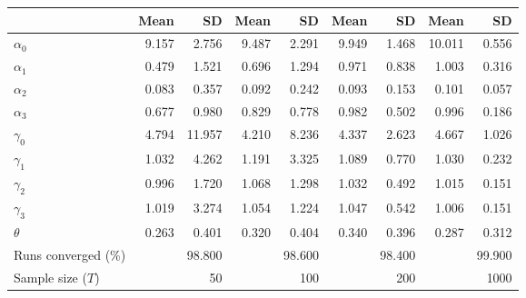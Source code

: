 
\begin{tabular}[t]{lrrrrrrrr}
\toprule
  & Mean & SD & Mean  & SD  & Mean   & SD   & Mean    & SD   \\
\midrule
$\alpha_{0}$ & 9.157 & 2.756 & 9.487 & 2.291 & 9.949 & 1.468 & 10.011 & 0.556\\
$\alpha_{1}$ & 0.479 & 1.521 & 0.696 & 1.294 & 0.971 & 0.838 & 1.003 & 0.316\\
$\alpha_{2}$ & 0.083 & 0.357 & 0.092 & 0.242 & 0.093 & 0.153 & 0.101 & 0.057\\
$\alpha_{3}$ & 0.677 & 0.980 & 0.829 & 0.778 & 0.982 & 0.502 & 0.996 & 0.186\\
$\gamma_{0}$ & 4.794 & 11.957 & 4.210 & 8.236 & 4.337 & 2.623 & 4.667 & 1.026\\
$\gamma_{1}$ & 1.032 & 4.262 & 1.191 & 3.325 & 1.089 & 0.770 & 1.030 & 0.232\\
$\gamma_{2}$ & 0.996 & 1.720 & 1.068 & 1.298 & 1.032 & 0.492 & 1.015 & 0.151\\
$\gamma_{3}$ & 1.019 & 3.274 & 1.054 & 1.224 & 1.047 & 0.542 & 1.006 & 0.151\\
$\theta$ & 0.263 & 0.401 & 0.320 & 0.404 & 0.340 & 0.396 & 0.287 & 0.312\\
Runs converged (\%) &  & 98.800 &  & 98.600 &  & 98.400 &  & 99.900\\
Sample size ($T$) &  & 50 &  & 100 &  & 200 &  & 1000\\
\bottomrule
\end{tabular}
